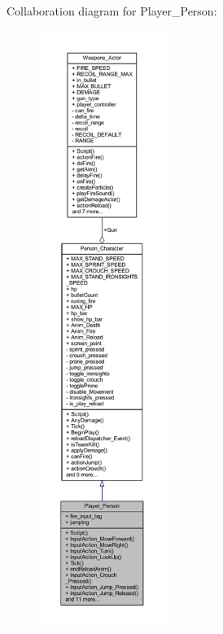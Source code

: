 Collaboration diagram for Player\+\_\+\+Person\+:\nopagebreak
\begin{figure}[H]
\begin{center}
\leavevmode
\includegraphics[height=550pt]{class_player___person__coll__graph}
\end{center}
\end{figure}

